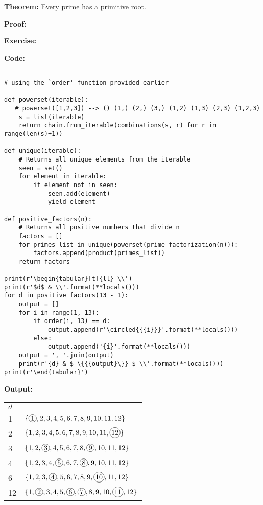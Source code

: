 \item \textbf{Theorem:} Every prime has a primitive root.

\textbf{Proof:} %

\item \textbf{Exercise:} 

\textbf{Code:}

\begin{verbatim}

# using the `order' function provided earlier

def powerset(iterable):
   # powerset([1,2,3]) --> () (1,) (2,) (3,) (1,2) (1,3) (2,3) (1,2,3)
    s = list(iterable)
    return chain.from_iterable(combinations(s, r) for r in range(len(s)+1))

def unique(iterable):
    # Returns all unique elements from the iterable
    seen = set()
    for element in iterable:
        if element not in seen:
            seen.add(element)
            yield element

def positive_factors(n):
    # Returns all positive numbers that divide n
    factors = []
    for primes_list in unique(powerset(prime_factorization(n))):
        factors.append(product(primes_list))
    return factors

print(r'\begin{tabular}[t]{ll} \\')
print(r'$d$ & \\'.format(**locals()))
for d in positive_factors(13 - 1):
    output = []
    for i in range(1, 13):
        if order(i, 13) == d:
            output.append(r'\circled{{{i}}}'.format(**locals()))
        else:
            output.append('{i}'.format(**locals()))
    output = ', '.join(output)
    print(r'{d} & $ \{{{output}\}} $ \\'.format(**locals()))
print(r'\end{tabular}')
\end{verbatim}

\textbf{Output:}

\begin{tabular}[t]{ll} \\
$d$ & \\
1 & $ \{\circled{1}, 2, 3, 4, 5, 6, 7, 8, 9, 10, 11, 12\} $ \\
2 & $ \{1, 2, 3, 4, 5, 6, 7, 8, 9, 10, 11, \circled{12}\} $ \\
3 & $ \{1, 2, \circled{3}, 4, 5, 6, 7, 8, \circled{9}, 10, 11, 12\} $ \\
4 & $ \{1, 2, 3, 4, \circled{5}, 6, 7, \circled{8}, 9, 10, 11, 12\} $ \\
6 & $ \{1, 2, 3, \circled{4}, 5, 6, 7, 8, 9, \circled{10}, 11, 12\} $ \\
12 & $ \{1, \circled{2}, 3, 4, 5, \circled{6}, \circled{7}, 8, 9, 10, \circled{11}, 12\} $ \\
\end{tabular}

